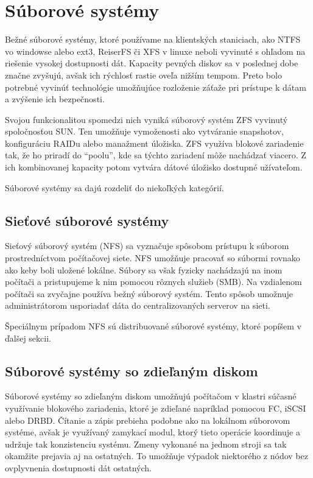 \section{Súborové systémy}
Bežné súborové systémy, ktoré používame na klientských staniciach, ako NTFS vo windowse alebo ext3, ReiserFS či XFS v linuxe neboli vyvinuté s ohľadom na riešenie vysokej dostupnosti dát. Kapacity pevných diskov sa v poslednej dobe značne zvyšujú, avšak ich rýchlosť rastie oveľa nižším tempom. Preto bolo potrebné vyvinúť technológie umožňujúce rozloženie záťaže pri prístupe k dátam a zvýšenie ich bezpečnosti. 

Svojou funkcionalitou spomedzi nich vyniká súborový systém ZFS vyvinutý spoločnosťou SUN. Ten umožňuje vymoženosti ako vytváranie snapshotov, konfiguráciu RAIDu alebo manažment úložiska. ZFS využíva blokové zariadenie tak, že ho priradí do "`poolu"', kde sa týchto zariadení môže nachádzať viacero. Z ich kombinovanej kapacity potom vytvára dátové úložisko dostupné užívateľom.

Súborové systémy sa dajú rozdeliť do niekoľkých kategórií.

\subsection{Sieťové súborové systémy}
Sieťový súborový systém (NFS) sa vyznačuje spôsobom prístupu k súborom prostredníctvom počítačovej siete. NFS umožňuje pracovať so súbormi rovnako ako keby boli uložené lokálne. Súbory sa však fyzicky nachádzajú na inom počítači a pristupujeme k nim pomocou rôznych služieb (SMB). Na vzdialenom počítači sa zvyčajne používa bežný súborový systém. Tento spôsob umožnuje administrátorom usporiadať dáta do centralizovaných serverov na sieti.

Špeciálnym prípadom NFS sú distribuované súborové systémy, ktoré popíšem v ďalšej sekcii.

\subsection{Súborové systémy so zdieľaným diskom}
Súborové systémy so zdieľaným diskom umožňujú počítačom v klastri súčasné využívanie blokového zariadenia, ktoré je zdieľané napríklad pomocou FC, iSCSI alebo DRBD. Čítanie a zápis prebieha podobne ako na lokálnom súborovom systéme, avšak je využívaný zamykací modul, ktorý tieto operácie koordinuje a udržuje tak konzistenciu systému. Zmeny vykonané na jednom stroji sa tak okamžite prejavia aj na ostatných. To umožňuje výpadok niektorého z nódov bez ovplyvnenia dostupnosti dát ostatných.

